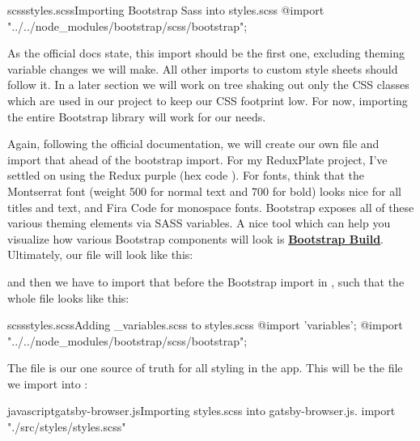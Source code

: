 \documentclass[a4paper,headinclude=on,footinclude=on,12pt,oneside]{scrbook}
\newcommand{\link}[2]{\textbf{\textcolor{monokaiPink}{\href{#2}{#1}}}}
\begin{document}
\begin{codeInput}{scss}{styles.scss}{Importing Bootstrap Sass into styles.scss}
@import "../../node_modules/bootstrap/scss/bootstrap";
\end{codeInput}

As the official docs state, this import should be the first one, excluding theming variable changes we will make. All other imports to custom style sheets should follow it. In a later section we will work on tree shaking out only the CSS classes which are used in our project to keep our CSS footprint low. For now, importing the entire Bootstrap library will work for our needs.


Again, following the official documentation, we will create our own  file and import that ahead of the bootstrap import. For my ReduxPlate project, I've settled on using the Redux purple (hex code ). For fonts, think that the Montserrat font (weight 500 for normal text and 700 for bold) looks nice for all titles and text, and Fira Code for monospace fonts. Bootstrap exposes all of these various theming elements via SASS variables. A nice tool which can help you visualize how various Bootstrap components will look is \link{Bootstrap Build}{https://bootstrap.build/app}. Ultimately, our  file will look like this:


and then we have to import that before the Bootstrap import in , such that the whole file looks like this:

\begin{codeInput}{scss}{styles.scss}{Adding \_variables.scss to styles.scss}
@import 'variables';
@import "../../node_modules/bootstrap/scss/bootstrap";
\end{codeInput}


The  file is our one source of truth for all styling in the app. This will be the file we import into :

\begin{codeInput}{javascript}{gatsby-browser.js}{Importing styles.scss into gatsby-browser.js.}
import "./src/styles/styles.scss"
\end{codeInput}
\end{document}
